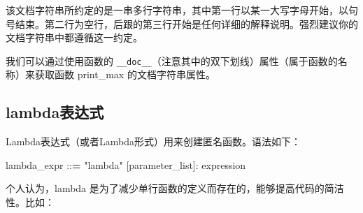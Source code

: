 \documentclass[]{ctexbook}
\newenvironment{Shaded}{\begin{snugshade}}{\end{snugshade}}
\newcommand{\BuiltInTok}[1]{#1}
\newcommand{\CommentTok}[1]{\textcolor[rgb]{0.56,0.35,0.01}{\textit{#1}}}
\newcommand{\ControlFlowTok}[1]{\textcolor[rgb]{0.13,0.29,0.53}{\textbf{#1}}}
\newcommand{\DecValTok}[1]{\textcolor[rgb]{0.00,0.00,0.81}{#1}}
\newcommand{\KeywordTok}[1]{\textcolor[rgb]{0.13,0.29,0.53}{\textbf{#1}}}
\newcommand{\NormalTok}[1]{#1}
\newcommand{\OperatorTok}[1]{\textcolor[rgb]{0.81,0.36,0.00}{\textbf{#1}}}
\newcommand{\StringTok}[1]{\textcolor[rgb]{0.31,0.60,0.02}{#1}}
\begin{document}
\begin{Shaded}
\end{Shaded}

该文档字符串所约定的是一串多行字符串，其中第一行以某一大写字母开始，以句号结束。第二行为空行，后跟的第三行开始是任何详细的解释说明。强烈建议你的文档字符串中都遵循这一约定。

我们可以通过使用函数的 \texttt{\_\_doc\_\_}（注意其中的双下划线）属性（属于函数的名称）来获取函数 print\_max 的文档字符串属性。

\hypertarget{lambdaux8868ux8fbeux5f0f}{%
\subsection{lambda表达式}\label{lambdaux8868ux8fbeux5f0f}}

Lambda表达式（或者Lambda形式）用来创建匿名函数。语法如下：

\begin{Shaded}
\begin{Highlighting}[]
\NormalTok{lambda_expr        ::}\OperatorTok{=}  \StringTok{"lambda"}\NormalTok{ [parameter_list]: expression}
\end{Highlighting}
\end{Shaded}

个人认为，lambda 是为了减少单行函数的定义而存在的，能够提高代码的简洁性。比如：
\end{document}
